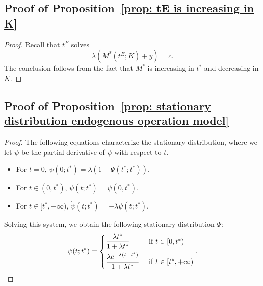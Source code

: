 \documentclass[12pt, letterpaper]{article}
\begin{document}
\subsection{Proof of Proposition~\ref{prop: tE is increasing in K}}
\begin{proof} %
Recall that $t^E$ solves
\begin{equation}
    \lambda (M^*(t^E; K) + y) = c.
\end{equation}
The conclusion follows from the fact that $M^*$ is increasing in $t^*$ and decreasing in $K$.
\end{proof} %

\subsection{Proof of Proposition~\ref{prop: stationary distribution endogenous operation model}}

\begin{proof}
The following equations characterize the stationary distribution, where we let $\dot{\psi}$ be the partial derivative of $\psi$ with respect to $t$.
\begin{itemize}
    \item For $t = 0$, $\psi(0; t^*) = \lambda (1 - \Psi(t^*; t^*))$. 
    \item For $t \in (0, t^*)$, $\psi(t; t^*) = \psi(0, t^*)$. 
    \item For $t \in [t^*, +\infty)$, $\dot{\psi}(t; t^*) = - \lambda \psi(t; t^*)$.
\end{itemize}
Solving this system, we obtain the following stationary distribution $\Psi$:
\begin{equation}
    \psi(t; t^*) = \begin{cases}
        \dfrac{\lambda t^*}{1 + \lambda t^*} & \text{ if } t \in [0, t^*) \vspace{0.5em}\\
        \dfrac{\lambda e^{-\lambda (t - t^*)}}{1 + \lambda t^*} & \text{ if } t \in [t^*, +\infty)
    \end{cases}.
\end{equation}
\end{proof} %
\end{document}
